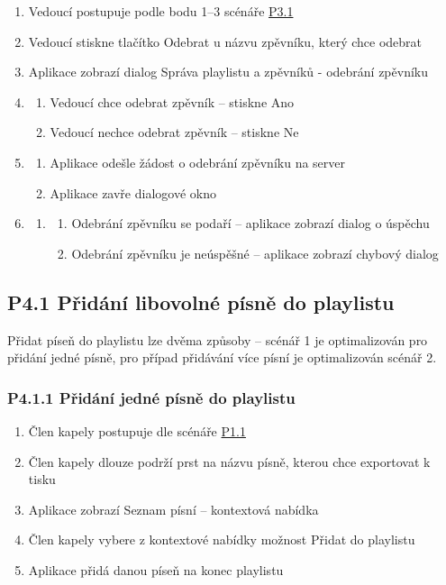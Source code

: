 \begin{enumerate}
    \item Vedoucí postupuje podle bodu 1--3 scénáře \hyperref[P3.1]{P3.1}
    \item Vedoucí stiskne tlačítko Odebrat u názvu zpěvníku, který chce odebrat
    \item Aplikace zobrazí dialog Správa playlistu a zpěvníků - odebrání zpěvníku
    \item \begin{enumerate}
        \item Vedoucí chce odebrat zpěvník -- stiskne Ano
	\item Vedoucí nechce odebrat zpěvník -- stiskne Ne
    \end{enumerate}
    \item \begin{enumerate}
        \item Aplikace odešle žádost o odebrání zpěvníku na server
	\item Aplikace zavře dialogové okno
    \end{enumerate}
    \item \begin{enumerate}
        \item \begin{enumerate}
            \item Odebrání zpěvníku se podaří -- aplikace zobrazí dialog o úspěchu
	    \item Odebrání zpěvníku je neúspěšné -- aplikace zobrazí chybový dialog
        \end{enumerate}
    \end{enumerate}
\end{enumerate}

\subsection{P4.1 Přidání libovolné písně do playlistu}
\label{P4.1}

Přidat píseň do playlistu lze dvěma způsoby -- scénář 1 je optimalizován pro přidání jedné písně, pro případ přidávání více písní je optimalizován scénář 2.

\subsubsection{P4.1.1 Přidání jedné písně do playlistu}
\label{P4.1.1}

\begin{enumerate}
    \item Člen kapely postupuje dle scénáře \hyperref[P1.1]{P1.1}
    \item Člen kapely dlouze podrží prst na názvu písně, kterou chce exportovat k tisku
    \item Aplikace zobrazí Seznam písní -- kontextová nabídka
    \item Člen kapely vybere z kontextové nabídky možnost Přidat do playlistu
    \item Aplikace přidá danou píseň na konec playlistu
\end{enumerate}

